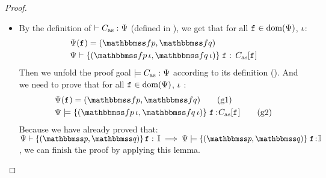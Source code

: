 {\begin{proof}
\begin{itemize}
        \item By the definition of 
            $\vdash {C_{\text{as}}} : {\Psi}$
            (defined in 
            \Fig{\ref{fig:Selected Inference Rules for Refinement Verification}}), 
            we get that for all $\texttt{f}_{} \in \text{dom}(\Psi{})$, $\iota$:
            \begin{align}
                & \Cspec(\lab{}) = (\relspecpre, \relspecpost)
                    \label{a:wfcdhp-spec} \\
                & \wfcblk{\relspecpre \, \lgvl}
                    {\relspecpost \, \lgvl}{\lab{}}{\asmimp[\lab{}]}
                    \label{a:wfcdblk}
            \end{align} 
            Then we unfold the proof goal $\models C_{\text{as}}:\Psi{}$
            according to its definition 
            (\Def{\ref{def:soundness of instruction sequence}}).
            And we need to prove that for all 
            $\texttt{f}_{} \in \text{dom}(\Psi{})$, $\iota$ : 
            \begin{align}
                & \Cspec{}(\lab{}) = (\relspecpre, \relspecpost)
                    \tag{g1} \label{g1} \\
                & \semwfseqrel{\Cspec{}}{\relspecpre \, \lgvl}
                    {\relspecpost \, \lgvl}{\asmimp[\lab{}]}
                    \tag{g2} \label{g2}
            \end{align}
            Because we have already proved that: 
            $\wdcblk{\Cspec}{\relastP}{\relastQ}{\lab{}}{\cblk}
            \implies 
            \semwfseqrel{\Cspec}{\relastP}{\relastQ}{\cblk}$, 
            we can finish the proof by applying this lemma. 
        

\end{itemize}
\end{proof}}
